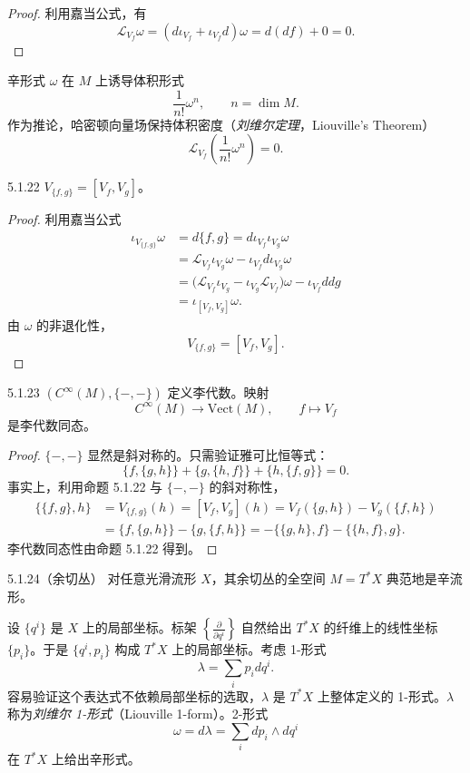 \begin{proof}
利用嘉当公式，有
\[
\mathcal{L}_{V_f}\omega=(d\iota_{V_f}+\iota_{V_f}d)\omega=d(df)+0=0.
\]
\end{proof}

辛形式 $\omega$ 在 $M$ 上诱导体积形式
\[
\frac{1}{n!}\omega^n,\qquad n=\dim M.
\]
作为推论，哈密顿向量场保持体积密度（\emph{刘维尔定理}，Liouville's Theorem）
\[
\mathcal{L}_{V_f}\left(\frac{1}{n!}\omega^n\right)=0.
\]

\begin{proposition}{5.1.22}
$V_{\{f,g\}}=[V_f,V_g]$。
\end{proposition}

\begin{proof}
利用嘉当公式
\[
\begin{aligned}
\iota_{V_{\{f,g\}}}\omega&=d\{f,g\}=d\iota_{V_f}\iota_{V_g}\omega\\
&=\mathcal{L}_{V_f}\iota_{V_g}\omega-\iota_{V_f}d\iota_{V_g}\omega\\
&=\big(\mathcal{L}_{V_f}\iota_{V_g}-\iota_{V_g}\mathcal{L}_{V_f}\big)\omega-\iota_{V_f}ddg\\
&=\iota_{[V_f,V_g]}\omega.
\end{aligned}
\]
由 $\omega$ 的非退化性，
\[
V_{\{f,g\}}=[V_f,V_g].
\]
\end{proof}

\begin{proposition}{5.1.23}
$(C^\infty(M),\{-,-\})$ 定义李代数。映射
\[
C^\infty(M)\longrightarrow\mathrm{Vect}(M),\qquad f\longmapsto V_f
\]
是李代数同态。
\end{proposition}

\begin{proof}
$\{-,-\}$ 显然是斜对称的。只需验证雅可比恒等式：
\[
\{f,\{g,h\}\}+\{g,\{h,f\}\}+\{h,\{f,g\}\}=0.
\]
事实上，利用命题 5.1.22 与 $\{-,-\}$ 的斜对称性，
\begin{align*}
\{\{f,g\},h\}&=V_{\{f,g\}}(h)=[V_f,V_g](h)=V_f(\{g,h\})-V_g(\{f,h\})\\
&=\{f,\{g,h\}\}-\{g,\{f,h\}\}=-\{\{g,h\},f\}-\{\{h,f\},g\}.
\end{align*}
李代数同态性由命题 5.1.22 得到。
\end{proof}


\begin{example}{5.1.24}（余切丛）
对任意光滑流形 $X$，其余切丛的全空间 $M=T^*X$ 典范地是辛流形。
\end{example}

设 $\{q^i\}$ 是 $X$ 上的局部坐标。标架 $\left\{\frac{\partial}{\partial q^i}\right\}$ 自然给出 $T^*X$ 的纤维上的线性坐标 $\{p_i\}$。于是 $\{q^i,p_i\}$ 构成 $T^*X$ 上的局部坐标。考虑 1-形式
\[
\lambda=\sum_i p_idq^i.
\]
容易验证这个表达式不依赖局部坐标的选取，$\lambda$ 是 $T^*X$ 上整体定义的 1-形式。$\lambda$ 称为\emph{刘维尔 1-形式}（Liouville 1-form）。2-形式
\[
\omega=d\lambda=\sum_i dp_i\wedge dq^i
\]
在 $T^*X$ 上给出辛形式。

